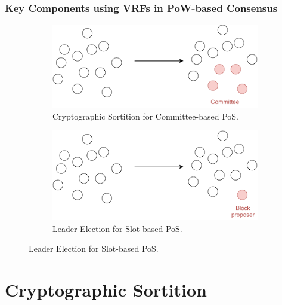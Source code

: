\documentclass{beamer}
\begin{document}
\begin{frame}
\frametitle{Key Components using VRFs in PoW-based Consensus}

\begin{figure}
    \begin{subfigure}{.45\textwidth}
        \centering
        \includegraphics[width=\linewidth]{./figs/sortition.pdf}  
        \caption{Cryptographic Sortition for Committee-based PoS.}
    \end{subfigure}
    \hfill
    \begin{subfigure}{.45\textwidth}
      \centering
      \includegraphics[width=\linewidth]{./figs/leader-election.pdf}  
      \caption{Leader Election for Slot-based PoS.}
    \end{subfigure}
\end{figure}


\end{frame}





\section{Cryptographic Sortition}
\end{document}
